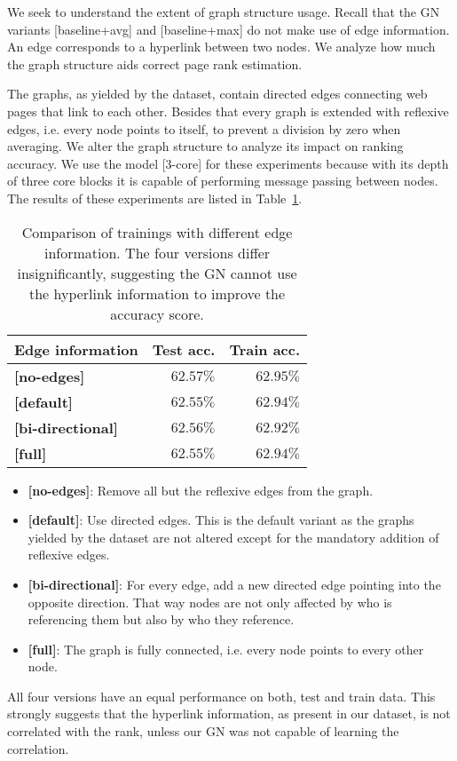 We seek to understand the extent of graph structure usage. Recall that the GN variants [baseline+avg] and [baseline+max] do not make use of edge information. An edge corresponds to a hyperlink between two nodes. We analyze how much the graph structure aids correct page rank estimation.

The graphs, as yielded by the dataset, contain directed edges connecting web pages that link to each other. Besides that every graph is extended with reflexive edges, i.e. every node points to itself, to prevent a division by zero when averaging. We alter the graph structure to analyze its impact on ranking accuracy. We use the model [3-core] for these experiments because with its depth of three core blocks it is capable of performing message passing between nodes. The results of these experiments are listed in Table~\ref{tab:edgecomparison}.

\begin{table}
    \centering
    \begin{tabular}{lrr}
        \textbf{Edge information} & \textbf{Test acc.} & \textbf{Train acc.}\\\hline
        \textbf{[no-edges]} & $\bm{62.57\%}$ & $\bm{62.95\%}$\\
        \textbf{[default]} & $62.55\%$ & $62.94\%$\\
        \textbf{[bi-directional]} & $62.56\%$ & $62.92\%$\\
        \textbf{[full]} & $62.55\%$ & $62.94\%$\\
    \end{tabular}
    \caption[Comparison of trainings with different edge information]{Comparison of trainings with different edge information. The four versions differ insignificantly, suggesting the GN cannot use the hyperlink information to improve the accuracy score.}
    \label{tab:edgecomparison}
\end{table}

\begin{itemize}
    \item \textbf{[no-edges]}: Remove all but the reflexive edges from the graph.
    \item \textbf{[default]}: Use directed edges. This is the default variant as the graphs yielded by the dataset are not altered except for the mandatory addition of reflexive edges.
    \item \textbf{[bi-directional]}: For every edge, add a new directed edge pointing into the opposite direction. That way nodes are not only affected by who is referencing them but also by who they reference.
    \item \textbf{[full]}: The graph is fully connected, i.e. every node points to every other node.
\end{itemize}

All four versions have an equal performance on both, test and train data. This strongly suggests that the hyperlink information, as present in our dataset, is not correlated with the rank, unless our GN was not capable of learning the correlation.

